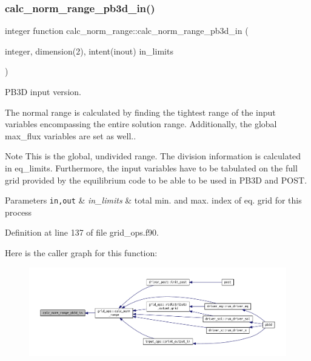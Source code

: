 \subsubsection{\texorpdfstring{calc\+\_\+norm\+\_\+range\+\_\+pb3d\+\_\+in()}{calc\_norm\_range\_pb3d\_in()}}
{\footnotesize\ttfamily integer function calc\+\_\+norm\+\_\+range\+::calc\+\_\+norm\+\_\+range\+\_\+pb3d\+\_\+in (\begin{DoxyParamCaption}\item[{integer, dimension(2), intent(inout)}]{in\+\_\+limits }\end{DoxyParamCaption})}



P\+B3D input version. 

The normal range is calculated by finding the tightest range of the input variables encompassing the entire solution range. Additionally, the global max\+\_\+flux variables are set as well..

\begin{DoxyNote}{Note}
This is the global, undivided range. The division information is calculated in \textquotesingle{}eq\+\_\+limits\textquotesingle{}. Furthermore, the input variables have to be tabulated on the full grid provided by the equilibrium code to be able to be used in P\+B3D and P\+O\+ST.
\end{DoxyNote}

\begin{DoxyParams}[1]{Parameters}
\mbox{\tt in,out}  & {\em in\+\_\+limits} & total min. and max. index of eq. grid for this process \\
\hline
\end{DoxyParams}


Definition at line 137 of file grid\+\_\+ops.\+f90.

Here is the caller graph for this function\+:\nopagebreak
\begin{figure}[H]
\begin{center}
\leavevmode
\includegraphics[width=350pt]{grid__ops_8f90_aebe21d718069318bced62bc3d2d09393_icgraph}
\end{center}
\end{figure}
\mbox{\label{grid__ops_8f90_a9121423739548f1a1fa4e87055f49010}} 
